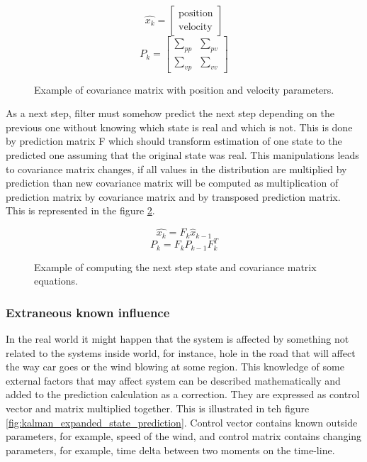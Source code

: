 \documentclass[../../main]{subfiles}
\begin{document}
\begin{figure} [ht!]
  \centering    
    \begin{equation}
       \hat{x_k} = \left[ \begin{array}{c} \text{position} \\ \text{velocity} \end{array} \right]
    \end{equation}
    \begin{equation}
       P_k = \begin{bmatrix} \sum_{pp} & \sum_{pv} \\ \sum_{vp} & \sum_{vv} \end{bmatrix}
    \end{equation}
    \label{fig:kalman_covariance_matrix}
  \caption{Example of covariance matrix with position and velocity parameters.}
\end{figure}

As a next step, filter must somehow predict the next step depending on the previous one without knowing which state is real and which is not. This is done by prediction matrix F which should transform estimation of one state to the predicted one assuming that the original state was real. This manipulations leads to covariance matrix changes, if all values in the distribution are multiplied by prediction than new covariance matrix will be computed as multiplication of prediction matrix by covariance matrix and by transposed prediction matrix. This is represented in the figure \ref{fig:kalman_next_step}.

\begin{figure} [ht!]
  \centering    
    \begin{equation}
       \hat{x_k} = F_k \hat{x}_{k-1}
    \end{equation}
     \begin{equation}
       P_k = F_k P_{k-1} F_k^T
    \end{equation}
    \label{fig:kalman_next_step}
  \caption{Example of computing the next step state and covariance matrix equations.}
\end{figure}

\subsubsection*{Extraneous known influence}

In the real world it might happen that the system is affected by something not related to the systems inside world, for instance, hole in the road that will affect the way car goes or the wind blowing at some region. This knowledge of some external factors that may affect system can be described mathematically and added to the prediction calculation as a correction. They are expressed as control vector and matrix multiplied together. This is illustrated in teh figure \ref{fig:kalman_expanded_state_prediction}. Control vector contains known outside parameters, for example, speed of the wind, and control matrix contains changing parameters, for example, time delta between two moments on the time-line.
\end{document}
